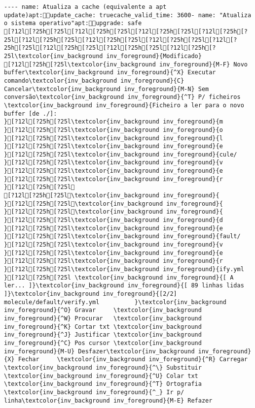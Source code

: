 \documentclass{scrartcl}
\begin{document}
\begin{Verbatim}
---- name: Atualiza a cache (equivalente a apt update)apt:update_cache: truecache_valid_time: 3600- name: "Atualiza o sistema operativo"apt:upgrade: safe
[?12l[?25h[?25l[?12l[?25h[?25l[?12l[?25h[?25l[?12l[?25h[?25l[?12l[?25h[?25l[?12l[?25h[?25l[?12l[?25h[?25l[?12l[?25h[?25l[?12l[?25h[?25l[?12l[?25h[?25l[?12l[?25h[?25l\textcolor{inv_background inv_foreground}{Modificado}
[?12l[?25h[?25l\textcolor{inv_background inv_foreground}{M-F} Novo buffer\textcolor{inv_background inv_foreground}{^X} Executar comando\textcolor{inv_background inv_foreground}{C} Cancelar\textcolor{inv_background inv_foreground}{M-N} Sem conversão\textcolor{inv_background inv_foreground}{^T} P/ ficheiros
\textcolor{inv_background inv_foreground}{Ficheiro a ler para o novo buffer [de ./]:                                                              }[?12l[?25h[?25l\textcolor{inv_background inv_foreground}{m
}[?12l[?25h[?25l\textcolor{inv_background inv_foreground}{o
}[?12l[?25h[?25l\textcolor{inv_background inv_foreground}{l
}[?12l[?25h[?25l\textcolor{inv_background inv_foreground}{e
}[?12l[?25h[?25l\textcolor{inv_background inv_foreground}{cule/
}[?12l[?25h[?25l\textcolor{inv_background inv_foreground}{v
}[?12l[?25h[?25l\textcolor{inv_background inv_foreground}{e
}[?12l[?25h[?25l\textcolor{inv_background inv_foreground}{r
}[?12l[?25h[?25l
[?12l[?25h[?25l\textcolor{inv_background inv_foreground}{ 
}[?12l[?25h[?25l\textcolor{inv_background inv_foreground}{ 
}[?12l[?25h[?25l\textcolor{inv_background inv_foreground}{ 
}[?12l[?25h[?25l\textcolor{inv_background inv_foreground}{d
}[?12l[?25h[?25l\textcolor{inv_background inv_foreground}{e
}[?12l[?25h[?25l\textcolor{inv_background inv_foreground}{fault/
}[?12l[?25h[?25l\textcolor{inv_background inv_foreground}{v
}[?12l[?25h[?25l\textcolor{inv_background inv_foreground}{e
}[?12l[?25h[?25l\textcolor{inv_background inv_foreground}{r
}[?12l[?25h[?25l\textcolor{inv_background inv_foreground}{ify.yml
}[?12l[?25h[?25l \textcolor{inv_background inv_foreground}{[ A ler... ]}\textcolor{inv_background inv_foreground}{[ 89 linhas lidas ]}\textcolor{inv_background inv_foreground}{[2/2]       molecule/default/verify.yml          }\textcolor{inv_background inv_foreground}{^O} Gravar     \textcolor{inv_background inv_foreground}{^W} Procurar   \textcolor{inv_background inv_foreground}{^K} Cortar txt \textcolor{inv_background inv_foreground}{^J} Justificar \textcolor{inv_background inv_foreground}{^C} Pos cursor \textcolor{inv_background inv_foreground}{M-U} Desfazer\textcolor{inv_background inv_foreground}{X} Fechar     \textcolor{inv_background inv_foreground}{^R} Carregar   \textcolor{inv_background inv_foreground}{^\} Substituir \textcolor{inv_background inv_foreground}{^U} Colar txt  \textcolor{inv_background inv_foreground}{^T} Ortografia \textcolor{inv_background inv_foreground}{^_} Ir p/ linha\textcolor{inv_background inv_foreground}{M-E} Refazer

\end{Verbatim}
\end{document}
